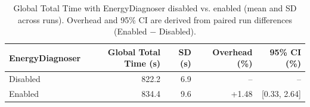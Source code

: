 \begin{table}[H]

\caption{\label{tab:runtime-global}Global Total Time with EnergyDiagnoser disabled vs. enabled (mean and SD across runs). Overhead and 95\% CI are derived from paired run differences (Enabled $-$ Disabled).}
\centering
\begin{tabular}[t]{lrrrr}
\toprule
EnergyDiagnoser & Global Total Time (s) & SD (s) & Overhead (\%) & 95\% CI (\%)\\
\midrule
Disabled & 822.2 & 6.9 & -- & --\\
Enabled & 834.4 & 9.6 & +1.48 & [0.33, 2.64]\\
\bottomrule
\end{tabular}
\end{table}
